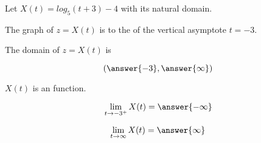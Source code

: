 \documentclass{ximera}
\author{Lee Wayand}
\begin{document}
\begin{exercise}






Let $X(t) = log_5(t+3) - 4$ with its natural domain. \\





\begin{question}


The graph of $z = X(t)$ is to the  of the vertical asymptote $t = -3$.


\end{question}





\begin{question}


The domain of $z = X(t)$ is 

\[
\left( \answer{-3}, \answer{\infty} \right)
\]


\end{question}






\begin{question}


$X(t)$ is an  function.


\end{question}











\begin{question}


\[
\lim\limits_{t \to -3^+} X(t) = \answer{-\infty}
\]


\end{question}








\begin{question}


\[
\lim\limits_{t \to \infty} X(t) = \answer{\infty}
\]


\end{question}










\end{exercise}
\end{document}
